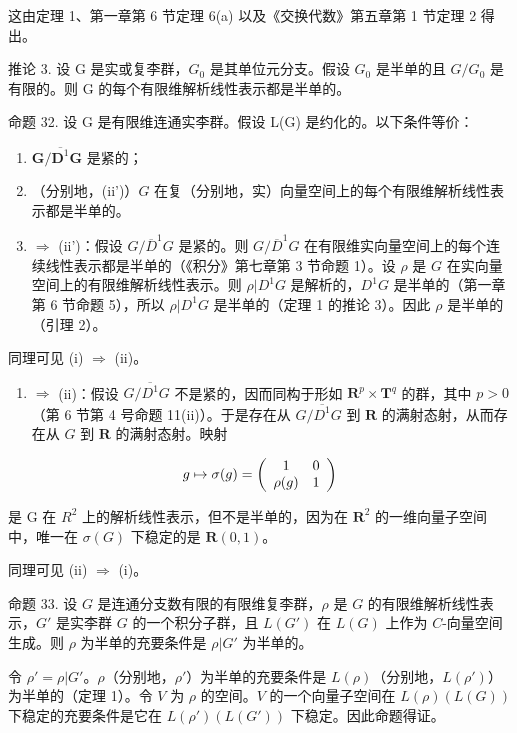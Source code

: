 这由定理 1、第一章第 6 节定理 6(a) 以及《交换代数》第五章第 1 节定理 2 得出。

推论 3. 设 G 是实或复李群，\(G_{0}\) 是其单位元分支。假设 \(G_{0}\) 是半单的且 \(G/G_{0}\) 是有限的。则 G 的每个有限维解析线性表示都是半单的。

命题 32. 设 G 是有限维连通实李群。假设 L(G) 是约化的。以下条件等价：

\begin{enumerate}
\def\labelenumi{(\roman{enumi})}
\item
  \(\mathbf{G} / \overline{\mathbf{D}^1}\mathbf{G}\) 是紧的；
\item
  （分别地，(ii')）\(G\) 在复（分别地，实）向量空间上的每个有限维解析线性表示都是半单的。
\item
  \(\Rightarrow\) (ii')：假设 \(G / \overline{D}^1 G\) 是紧的。则 \(G / \overline{D}^1 G\) 在有限维实向量空间上的每个连续线性表示都是半单的（《积分》第七章第 3 节命题 1）。设 \(\rho\) 是 \(G\) 在实向量空间上的有限维解析线性表示。则 \(\rho |D^1 G\) 是解析的，\(D^1 G\) 是半单的（第一章第 6 节命题 5），所以 \(\rho |D^1 G\) 是半单的（定理 1 的推论 3）。因此 \(\rho\) 是半单的（引理 2）。
\end{enumerate}

同理可见 (i) \(\Rightarrow\) (ii)。

\begin{enumerate}
\def\labelenumi{(\roman{enumi})}
\tightlist
\item
  \(\Rightarrow\) (ii)：假设 \(G / \overline{D^1} G\) 不是紧的，因而同构于形如 \(\mathbf{R}^p\times \mathbf{T}^q\) 的群，其中 \(p > 0\)（第 6 节第 4 号命题 11(ii)）。于是存在从 \(G / \overline{D^1} G\) 到 \(\mathbf{R}\) 的满射态射，从而存在从 \(G\) 到 \(\mathbf{R}\) 的满射态射。映射
\end{enumerate}

\[
g \mapsto \sigma (g) = \left( \begin{array}{c c} 1 & 0 \\ \rho (g) & 1 \end{array} \right)
\]

是 G 在 \(R^{2}\) 上的解析线性表示，但不是半单的，因为在 \(\mathbf{R}^2\) 的一维向量子空间中，唯一在 \(\sigma(G)\) 下稳定的是 \(\mathbf{R}(0,1)\)。

同理可见 (ii) \(\Rightarrow\) (i)。

命题 33. 设 \(G\) 是连通分支数有限的有限维复李群，\(\rho\) 是 \(G\) 的有限维解析线性表示，\(G'\) 是实李群 \(G\) 的一个积分子群，且 \(L(G')\) 在 \(L(G)\) 上作为 \(C\)-向量空间生成。则 \(\rho\) 为半单的充要条件是 \(\rho |G'\) 为半单的。

令 \(\rho' = \rho|G'\)。\(\rho\)（分别地，\(\rho'\)）为半单的充要条件是 \(L(\rho)\)（分别地，\(L(\rho')\)）为半单的（定理 1）。令 \(V\) 为 \(\rho\) 的空间。\(V\) 的一个向量子空间在 \(L(\rho)(L(G))\) 下稳定的充要条件是它在 \(L(\rho')(L(G'))\) 下稳定。因此命题得证。

